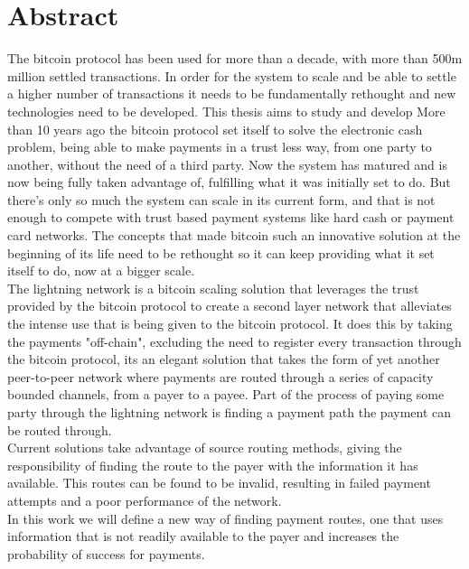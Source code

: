 \section{Abstract}

The bitcoin protocol has been used for more than a decade, with more than 500m million settled transactions. In order for the system to scale and be able to settle a higher number of transactions it needs to be fundamentally rethought and new technologies need to be developed. This thesis aims to study and develop 
More than 10 years ago the bitcoin protocol set itself to solve the electronic cash problem, being able to make payments in a trust less way, from one party to another, without the need of a third party. 
Now the system has matured and is now being fully taken advantage of, fulfilling what it was initially set to do. But there's only so much the system can scale in its current form, and that is not enough to compete with trust based payment systems like hard cash or payment card networks. The concepts that made bitcoin such an innovative solution at the beginning of its life need to be rethought so it can keep providing what it set itself to do, now at a bigger scale. \\
The lightning network is a bitcoin scaling solution that leverages the trust provided by the bitcoin protocol to create a second layer network that alleviates the intense use that is being given to the bitcoin protocol. It does this by taking the payments "off-chain", excluding the need to register every transaction through the bitcoin protocol, its an elegant solution that takes the form of yet another peer-to-peer network where payments are routed through a series of capacity bounded channels, from a payer to a payee. Part of the process of paying some party through the lightning network is finding a payment path the payment can be routed through. \\
Current solutions take advantage of source routing methods, giving the responsibility of finding the route to the payer with the information it has available. This routes can be found to be invalid, resulting in failed payment attempts and a poor performance of the network. \\
In this work we will define a new way of finding payment routes, one that uses information that is not readily available to the payer and increases the probability of success for payments.